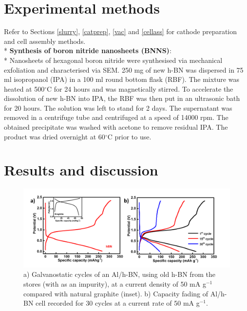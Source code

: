 \section{Experimental methods}
Refer to Sections \ref{slurry}, \ref{catprep}, \ref{vac} and \ref{cellass} for cathode preparation and cell assembly methods. \\*
\textbf{Synthesis of boron nitride nanosheets (BNNS)}: \\*
Nanosheets of hexagonal boron nitride were synthesised via mechanical exfoliation and characterised via SEM. 250 mg of new h-BN was dispersed in 75 ml isopropanol (IPA) in a 100 ml round bottom flask (RBF). The mixture was heated at 500$^{\circ}$C for 24 hours and was magnetically stirred. To accelerate the dissolution of new h-BN into IPA, the RBF was then put in an ultrasonic bath for 20 hours. The solution was left to stand for 2 days. The supernatant was removed in a centrifuge tube and centrifuged at a speed of 14000 rpm. The obtained precipitate was washed with acetone to remove residual IPA. The product was dried overnight at 60$^{\circ}$C prior to use. 

\section{Results and discussion}

\begin{figure}[tbh!]
\centering
\includegraphics[width=\textwidth]{Figures/BOhBN/hBNiniCDC}
\caption{a) Galvanostatic cycles of an Al/h-BN, using old h-BN from the stores (with  as an impurity), at a current density of 50 mA g$^{-1}$ compared with natural graphite (inset). b) Capacity fading of Al/h-BN cell recorded for 30 cycles at a current rate of 50 mA g$^{-1}$.}
\label{Figures/BOhBN:hBNiniCDC}
\end{figure}


